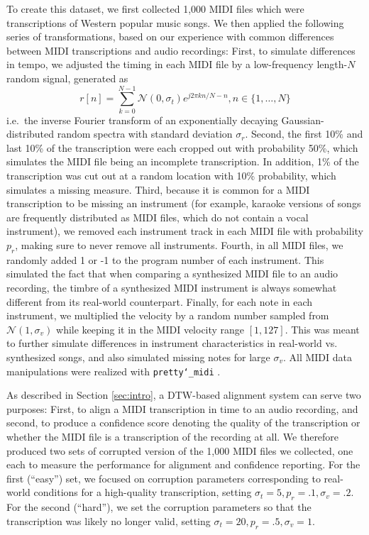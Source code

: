 \documentclass{article}
\begin{document}
To create this dataset, we first collected 1,000 MIDI files which were transcriptions of Western popular music songs.
We then applied the following series of transformations, based on our experience with common differences between MIDI transcriptions and audio recordings:
First, to simulate differences in tempo, we adjusted the timing in each MIDI file by a low-frequency length-$N$ random signal, generated as
$$
r[n] = \sum_{k = 0}^{N - 1} \mathcal{N}(0, \sigma_t) e^{j2\pi kn/N - n}, n \in \{1, \ldots, N\}
$$
i.e.\ the inverse Fourier transform of an exponentially decaying Gaussian-distributed random spectra with standard deviation $\sigma_r$.
Second, the first 10\% and last 10\% of the transcription were each cropped out with probability 50\%, which simulates the MIDI file being an incomplete transcription.
In addition, 1\% of the transcription was cut out at a random location with 10\% probability, which simulates a missing measure.
Third, because it is common for a MIDI transcription to be missing an instrument (for example, karaoke versions of songs are frequently distributed as MIDI files, which do not contain a vocal instrument), we removed each instrument track in each MIDI file with probability $p_r$, making sure to never remove all instruments.
Fourth, in all MIDI files, we randomly added 1 or -1 to the program number of each instrument.
This simulated the fact that when comparing a synthesized MIDI file to an audio recording, the timbre of a synthesized MIDI instrument is always somewhat different from its real-world counterpart.
Finally, for each note in each instrument, we multiplied the velocity by a random number sampled from $\mathcal{N}(1, \sigma_v)$ while keeping it in the MIDI velocity range $[1, 127]$.
This was meant to further simulate differences in instrument characteristics in real-world vs. synthesized songs, and also simulated missing notes for large $\sigma_v$.
All MIDI data manipulations were realized with \texttt{pretty\char`_midi} \cite{raffel2014pretty_midi}.

As described in Section \ref{sec:intro}, a DTW-based alignment system can serve two purposes: First, to align a MIDI transcription in time to an audio recording, and second, to produce a confidence score denoting the quality of the transcription or whether the MIDI file is a transcription of the recording at all.
We therefore produced two sets of corrupted version of the 1,000 MIDI files we collected, one each to measure the performance for alignment and confidence reporting.
For the first (``easy'') set, we focused on corruption parameters corresponding to real-world conditions for a high-quality transcription, setting $\sigma_t = 5, p_r = .1, \sigma_v = .2$.
For the second (``hard''), we set the corruption parameters so that the transcription was likely no longer valid, setting $\sigma_t = 20, p_r = .5, \sigma_v = 1$.
\end{document}
